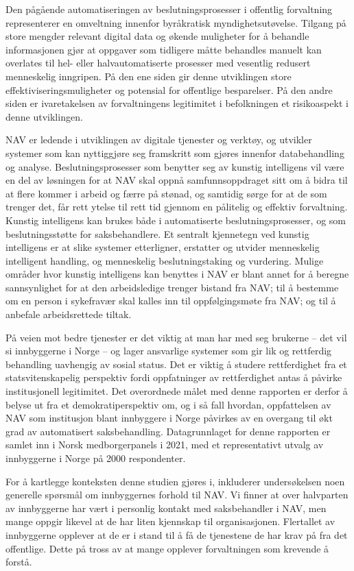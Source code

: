 \documentclass[
]{book}
\begin{document}
Den pågående automatiseringen av beslutningsprosesser i offentlig forvaltning representerer en omveltning innenfor byråkratisk myndighetsutøvelse.
Tilgang på store mengder relevant digital data og økende muligheter for å behandle informasjonen gjør at oppgaver som tidligere måtte behandles manuelt kan overlates til hel- eller halvautomatiserte prosesser med vesentlig redusert menneskelig inngripen.
På den ene siden gir denne utviklingen store effektiviseringsmuligheter og potensial for offentlige besparelser.
På den andre siden er ivaretakelsen av forvaltningens legitimitet i befolkningen et risikoaspekt i denne utviklingen.

NAV er ledende i utviklingen av digitale tjenester og verktøy, og utvikler systemer som kan nyttiggjøre seg framskritt som gjøres innenfor databehandling og analyse.
Beslutningsprosesser som benytter seg av kunstig intelligens vil være en del av løsningen for at NAV skal oppnå samfunnsoppdraget sitt om å bidra til at flere kommer i arbeid og færre på stønad, og samtidig sørge for at de som trenger det, får rett ytelse til rett tid gjennom en pålitelig og effektiv forvaltning.
Kunstig intelligens kan brukes både i automatiserte beslutningsprosesser, og som beslutningsstøtte for saksbehandlere.
Et sentralt kjennetegn ved kunstig intelligens er at slike systemer etterligner, erstatter og utvider menneskelig intelligent handling, og menneskelig beslutningstaking og vurdering.
Mulige områder hvor kunstig intelligens kan benyttes i NAV er blant annet for å beregne sannsynlighet for at den arbeidsledige trenger bistand fra NAV; til å bestemme om en person i sykefravær skal kalles inn til oppfølgingsmøte fra NAV; og til å anbefale arbeidsrettede tiltak.

På veien mot bedre tjenester er det viktig at man har med seg brukerne -- det vil si innbyggerne i Norge -- og lager ansvarlige systemer som gir lik og rettferdig behandling uavhengig av sosial status.
Det er viktig å studere rettferdighet fra et statsvitenskapelig perspektiv fordi oppfatninger av rettferdighet antas å påvirke institusjonell legitimitet.
Det overordnede målet med denne rapporten er derfor å belyse ut fra et demokratiperspektiv om, og i så fall hvordan, oppfattelsen av NAV som institusjon blant innbyggere i Norge påvirkes av en overgang til økt grad av automatisert saksbehandling.
Datagrunnlaget for denne rapporten er samlet inn i Norsk medborgerpanels i 2021, med et representativt utvalg av innbyggerne i Norge på 2000 respondenter.

For å kartlegge konteksten denne studien gjøres i, inkluderer undersøkelsen noen generelle spørsmål om innbyggernes forhold til NAV.
Vi finner at over halvparten av innbyggerne har vært i personlig kontakt med saksbehandler i NAV, men mange oppgir likevel at de har liten kjennskap til organisasjonen.
Flertallet av innbyggerne opplever at de er i stand til å få de tjenestene de har krav på fra det offentlige.
Dette på tross av at mange opplever forvaltningen som krevende å forstå.
\end{document}
